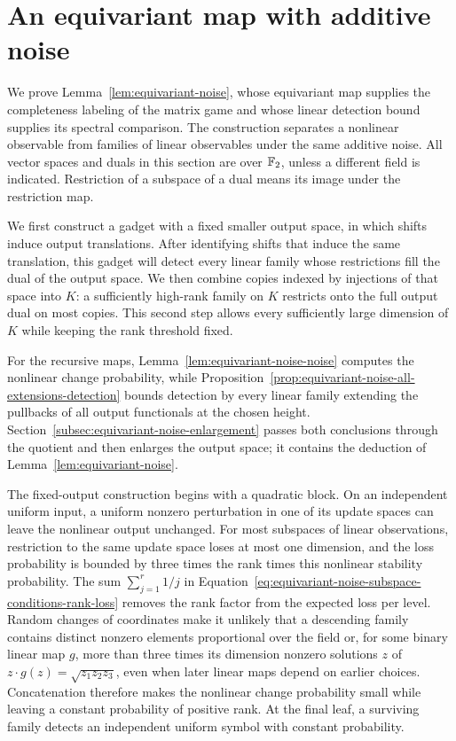 \section{An equivariant map with additive noise}\label{sec:equivariant-noise}

We prove Lemma~\ref{lem:equivariant-noise}, whose equivariant map supplies the
completeness labeling of the matrix game and whose linear detection bound
supplies its spectral comparison.  The construction separates a nonlinear
observable from families of linear observables under the same additive noise.  All vector spaces and
duals in this section are over $\mathbb F_2$, unless a different field is indicated.
Restriction of a subspace of a dual means its image under the restriction map.

We first construct a gadget with a fixed smaller output space, in which
shifts induce output translations.  After identifying shifts that induce
the same translation, this gadget will detect every linear family whose
restrictions fill the dual of the output space.  We then combine copies
indexed by injections of that space into $K$: a sufficiently high-rank
family on $K$ restricts onto the full output dual on most copies.  This second step allows every sufficiently large
dimension of $K$ while keeping the rank threshold fixed.

For the recursive maps, Lemma~\ref{lem:equivariant-noise-noise} computes the
nonlinear change probability, while
Proposition~\ref{prop:equivariant-noise-all-extensions-detection} bounds detection by every
linear family extending the pullbacks of all output functionals at the chosen height.  Section~\ref{subsec:equivariant-noise-enlargement}
passes both conclusions through the quotient and then enlarges the output
space; it contains the deduction of Lemma~\ref{lem:equivariant-noise}.

The fixed-output construction begins with a quadratic block.  On an
independent uniform input, a uniform nonzero perturbation in one of its
update spaces can leave the nonlinear output unchanged.  For most
subspaces of linear observations, restriction to the same update space
loses at most one dimension, and the loss probability is bounded by
three times the rank times this nonlinear stability probability.
The sum $\sum_{j=1}^r1/j$ in Equation~\eqref{eq:equivariant-noise-subspace-conditions-rank-loss}
removes the rank factor from the expected loss per level.  Random changes of coordinates
make it unlikely that a descending family contains distinct nonzero elements
proportional over the field or, for some binary linear map $g$, more than
three times its dimension nonzero solutions $z$ of
$z\cdot g(z)=\sqrt{z_1z_2z_3}$, even when later linear maps
depend on earlier choices.
Concatenation therefore makes the nonlinear change probability small while
leaving a constant probability of positive rank.  At the final leaf, a
surviving family detects an independent uniform symbol with constant
probability.

